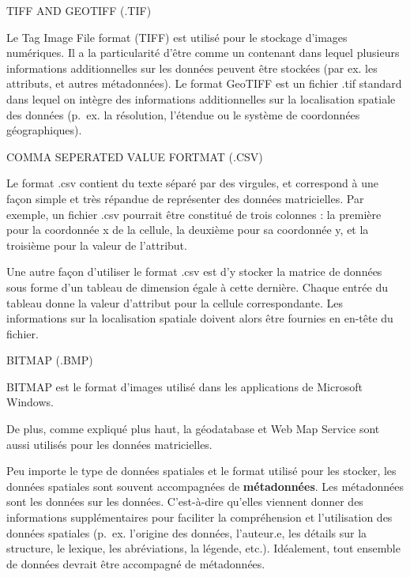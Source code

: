 \documentclass[
  12pt,
]{krantz}
\renewenvironment{quote}{\begin{VF}}{\end{VF}}
\begin{document}
\begin{quote}
TIFF AND GEOTIFF (.TIF)
\end{quote}

Le Tag Image File format (TIFF) est utilisé pour le stockage d'images numériques. Il a la particularité d'être comme un contenant dans lequel plusieurs informations additionnelles sur les données peuvent être stockées (par ex. les attributs, et autres métadonnées).
Le format GeoTIFF est un fichier .tif standard dans lequel on intègre des informations additionnelles sur la localisation spatiale des données (p.~ex. la résolution, l'étendue ou le système de coordonnées géographiques).

\begin{quote}
COMMA SEPERATED VALUE FORTMAT (.CSV)
\end{quote}

Le format .csv contient du texte séparé par des virgules, et correspond à une façon simple et très répandue de représenter des données matricielles. Par exemple, un fichier .csv pourrait être constitué de trois colonnes : la première pour la coordonnée x de la cellule, la deuxième pour sa coordonnée y, et la troisième pour la valeur de l'attribut.

Une autre façon d'utiliser le format .csv est d'y stocker la matrice de données sous forme d'un tableau de dimension égale à cette dernière. Chaque entrée du tableau donne la valeur d'attribut pour la cellule correspondante. Les informations sur la localisation spatiale doivent alors être fournies en en-tête du fichier.

\begin{quote}
BITMAP (.BMP)
\end{quote}

BITMAP est le format d'images utilisé dans les applications de Microsoft Windows.

De plus, comme expliqué plus haut, la géodatabase et Web Map Service sont aussi utilisés pour les données matricielles.

Peu importe le type de données spatiales et le format utilisé pour les stocker, les données spatiales sont souvent accompagnées de \textbf{métadonnées}. Les métadonnées sont les données sur les données. C'est-à-dire qu'elles viennent donner des informations supplémentaires pour faciliter la compréhension et l'utilisation des données spatiales (p.~ex. l'origine des données, l'auteur.e, les détails sur la structure, le lexique, les abréviations, la légende, etc.). Idéalement, tout ensemble de données devrait être accompagné de métadonnées.
\end{document}
